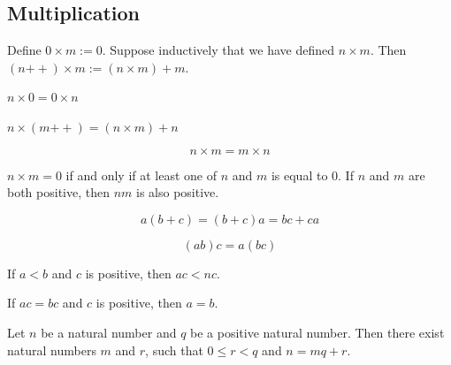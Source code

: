 \documentclass{blog}
\begin{document}
\subsection{Multiplication}
\begin{definition}[multiplication]
  Define $0 \times m := 0$.
  Suppose inductively that we have defined $n \times m$.
  Then $(n{++}) \times m := (n \times m) + m$.
\end{definition}

\begin{lemma}
  $n \times 0 = 0 \times n$
\end{lemma}

\begin{lemma}
  $n \times (m{++}) = (n \times m) + n$
\end{lemma}

\begin{proposition}
  \begin{equation}
    n \times m = m \times n
  \end{equation}
\end{proposition}

\begin{lemma}
  $n \times m = 0$ if and only if at least one of $n$ and $m$ is equal to 0.
  If $n$ and $m$ are both positive, then $nm$ is also positive.
\end{lemma}

\begin{proposition}
  \begin{equation}
    a(b+c)=(b+c)a=bc+ca
  \end{equation}
\end{proposition}

\begin{proposition}
  \begin{equation}
    (ab)c=a(bc)
  \end{equation}
\end{proposition}

\begin{lemma}
  If $a<b$ and $c$ is positive, then $ac<nc$.
\end{lemma}

\begin{proposition}
  If $ac=bc$ and $c$ is positive, then $a=b$.
\end{proposition}

\begin{proposition}
  Let $n$ be a natural number and $q$ be a positive natural number.
  Then there exist natural numbers $m$ and $r$, such that $0 \leq r < q$ and $n=mq+r$.
\end{proposition}
\end{document}
